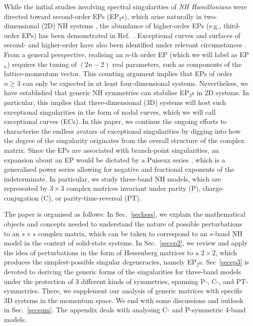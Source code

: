 \documentclass[aps, prb, onecolumn, nofootinbib, citeautoscript, 10pt]{revtex4-2}
\begin{document}
While the initial studies involving spectral singularities of \textit{NH Hamiltonians} were directed toward second-order EPs (EP$_2$s), which arise naturally in two-dimensional (2D) NH systems \cite{koziifu, NHarc}, the abundance of higher-order EPs (e.g., third-order EPs) has been demonstrated in Ref.~\cite{ips-emil}. Exceptional curves and surfaces of second- and higher-order have also been identified under relevant circumstances \cite{EPrings, emil-johan, EPringExp, emil-marcus}. From a general perspective, realising an $n$-th order EP (which we will label as EP$_n$) requires the tuning of $(2n-2)$ real parameters, such as components of the lattice-momentum vector. This counting argument implies that EPs of order $n \geq 3$ can only be expected in at least four-dimensional systems. Nevertheless, we have established that generic NH symmetries can stabilise EP$_3$s in 2D systems. In particular, this implies that three-dimensional (3D) systems will host such exceptional singularities in the form of nodal curves, which we will call exceptional curves (ECs). In this paper, we continue the ongoing efforts to characterise the endless avatars of exceptional singularities by digging into how the degree of the singularity originates from the overall structure of the complex matrix. Since the EPs are associated with branch-point singularities, an expansion about an EP would be dictated by a Puiseux series \cite{kato, ma-pert, Demange_2012}, which is  a generalised power series allowing for negative and fractional exponents of the indeterminate. In particular, we study three-band NH models, which are represented by $3\times 3$ complex matrices invariant under parity (P), charge-conjugation (C), or parity-time-reversal (PT).

The paper is organised as follows: In Sec.~\ref{sechess}, we explain the mathematical objects and concepts needed to understand the nature of possible perturbations to an $s \times s$ complex matrix, which can be taken to correspond to an $s$-band NH model in the context of solid-state systems. In Sec.~\ref{secep2}, we review and apply the idea of perturbations in the form of Hessenberg matrices to a $2\times 2$, which produces the simplest-possible singular degeneracies, namely EP$_2$s. Sec~\ref{secep3} is devoted to deriving the generic forms of the singularities for three-band models under the protection of 3 different kinds of symmetries, spanning P-, C-, and PT-symmetries. There, we supplement our analysis of generic matrices with specific 3D systems in the momentum space. We end with some discussions and outlook in Sec.~\ref{secsum}.
The appendix deals with analysing C- and P-symmetric 4-band models.
 
\end{document}
